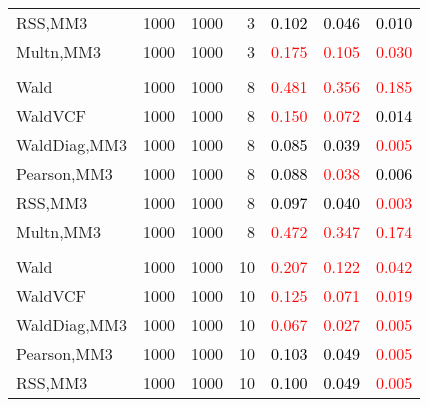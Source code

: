 \documentclass[
]{article}
\begin{document}
\begin{table}[H]
{\begin{tabular}[t]{lrrrrrr}
\hspace{1em}RSS,MM3 & 1000 & 1000 & 3 & \textcolor{black}{0.102} & \textcolor{black}{0.046} & \textcolor{black}{0.010}\\
\hspace{1em}Multn,MM3 & 1000 & 1000 & 3 & \textcolor{red}{0.175} & \textcolor{red}{0.105} & \textcolor{red}{0.030}\\
\addlinespace[0.3em]
\multicolumn{7}{l}{\textbf{1F 15V}}\\
\hspace{1em}Wald & 1000 & 1000 & 8 & \textcolor{red}{0.481} & \textcolor{red}{0.356} & \textcolor{red}{0.185}\\
\hspace{1em}WaldVCF & 1000 & 1000 & 8 & \textcolor{red}{0.150} & \textcolor{red}{0.072} & \textcolor{black}{0.014}\\
\hspace{1em}WaldDiag,MM3 & 1000 & 1000 & 8 & \textcolor{black}{0.085} & \textcolor{black}{0.039} & \textcolor{red}{0.005}\\
\hspace{1em}Pearson,MM3 & 1000 & 1000 & 8 & \textcolor{black}{0.088} & \textcolor{red}{0.038} & \textcolor{black}{0.006}\\
\hspace{1em}RSS,MM3 & 1000 & 1000 & 8 & \textcolor{black}{0.097} & \textcolor{black}{0.040} & \textcolor{red}{0.003}\\
\hspace{1em}Multn,MM3 & 1000 & 1000 & 8 & \textcolor{red}{0.472} & \textcolor{red}{0.347} & \textcolor{red}{0.174}\\
\addlinespace[0.3em]
\multicolumn{7}{l}{\textbf{2F 10V}}\\
\hspace{1em}Wald & 1000 & 1000 & 10 & \textcolor{red}{0.207} & \textcolor{red}{0.122} & \textcolor{red}{0.042}\\
\hspace{1em}WaldVCF & 1000 & 1000 & 10 & \textcolor{red}{0.125} & \textcolor{red}{0.071} & \textcolor{red}{0.019}\\
\hspace{1em}WaldDiag,MM3 & 1000 & 1000 & 10 & \textcolor{red}{0.067} & \textcolor{red}{0.027} & \textcolor{red}{0.005}\\
\hspace{1em}Pearson,MM3 & 1000 & 1000 & 10 & \textcolor{black}{0.103} & \textcolor{black}{0.049} & \textcolor{red}{0.005}\\
\hspace{1em}RSS,MM3 & 1000 & 1000 & 10 & \textcolor{black}{0.100} & \textcolor{black}{0.049} & \textcolor{red}{0.005}\\

\end{tabular}}
\end{table}
\end{document}
